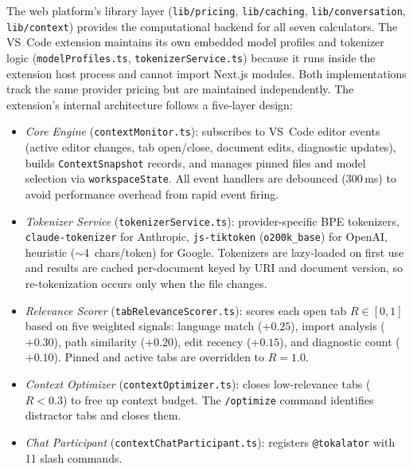 \documentclass[a4paper,fleqn]{cas-dc}
\begin{document}
The web platform's library layer (\texttt{lib/pricing}, \texttt{lib/caching}, \texttt{lib/conversation}, \texttt{lib/context}) provides the computational backend for all seven calculators. The VS~Code extension maintains its own embedded model profiles and tokenizer logic (\texttt{modelProfiles.ts}, \texttt{tokenizerService.ts}) because it runs inside the extension host process and cannot import Next.js modules. Both implementations track the same provider pricing but are maintained independently. The extension's internal architecture follows a five-layer design:
\begin{itemize}
  \item \textit{Core Engine} (\texttt{contextMonitor.ts}): subscribes to VS~Code editor events (active editor changes, tab open/close, document edits, diagnostic updates), builds \texttt{ContextSnapshot} records, and manages pinned files and model selection via \texttt{workspaceState}. All event handlers are debounced (300\,ms) to avoid performance overhead from rapid event firing.
  \item \textit{Tokenizer Service} (\texttt{tokenizerService.ts}): provider-specific BPE tokenizers, \texttt{claude-tokenizer} for Anthropic, \texttt{js-tiktoken} (\texttt{o200k\_base}) for OpenAI, heuristic ($\sim$4~chars/token) for Google. Tokenizers are lazy-loaded on first use and results are cached per-document keyed by URI and document version, so re-tokenization occurs only when the file changes.
  \item \textit{Relevance Scorer} (\texttt{tabRelevanceScorer.ts}): scores each open tab $R \in [0, 1]$ based on five weighted signals: language match ($+0.25$), import analysis ($+0.30$), path similarity ($+0.20$), edit recency ($+0.15$), and diagnostic count ($+0.10$). Pinned and active tabs are overridden to $R = 1.0$.
  \item \textit{Context Optimizer} (\texttt{contextOptimizer.ts}): closes low-relevance tabs ($R < 0.3$) to free up context budget. The \texttt{/optimize} command identifies distractor tabs and closes them.
  \item \textit{Chat Participant} (\texttt{contextChatParticipant.ts}): registers \texttt{@tokalator} with 11 slash commands.
\end{itemize}
\end{document}
